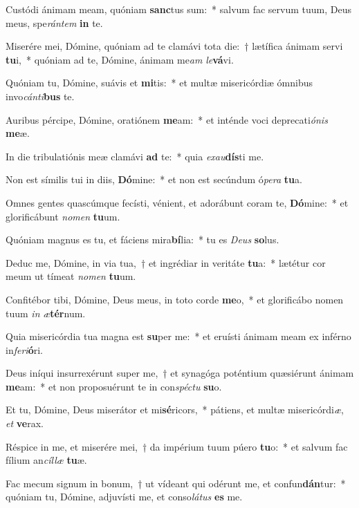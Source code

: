 \item Custódi ánimam meam, quóniam \textbf{sanc}tus sum:~* salvum fac servum tuum, Deus meus, spe\textit{rán}\textit{tem} \textbf{in} te.
\item Miserére mei, Dómine, quóniam ad te clamávi tota die:~† lætífica ánimam servi \textbf{tu}i,~* quóniam ad te, Dómine, ánimam me\textit{am} \textit{le}\textbf{vá}vi.
\item Quóniam tu, Dómine, suávis et \textbf{mi}tis:~* et multæ misericórdiæ ómnibus invo\textit{cán}\textit{ti}\textbf{bus} te.
\item Auribus pércipe, Dómine, oratiónem \textbf{me}am:~* et inténde voci deprecati\textit{ó}\textit{nis} \textbf{me}æ.
\item In die tribulatiónis meæ clamávi \textbf{ad} te:~* quia \textit{ex}\textit{au}\textbf{dís}ti me.
\item Non est símilis tui in diis, \textbf{Dó}mine:~* et non est secúndum ó\textit{pe}\textit{ra} \textbf{tu}a.
\item Omnes gentes quascúmque fecísti, vénient, et adorábunt coram te, \textbf{Dó}mine:~* et glorificábunt \textit{no}\textit{men} \textbf{tu}um.
\item Quóniam magnus es tu, et fáciens mira\textbf{bí}lia:~* tu es \textit{De}\textit{us} \textbf{so}lus.
\item Deduc me, Dómine, in via tua,~† et ingrédiar in veritáte \textbf{tu}a:~* lætétur cor meum ut tímeat \textit{no}\textit{men} \textbf{tu}um.
\item Confitébor tibi, Dómine, Deus meus, in toto corde \textbf{me}o,~* et glorificábo nomen tuum \textit{in} \textit{æ}\textbf{tér}num.
\item Quia misericórdia tua magna est \textbf{su}per me:~* et eruísti ánimam meam ex inférno in\textit{fe}\textit{ri}\textbf{ó}ri.
\item Deus iníqui insurrexérunt super me,~† et synagóga poténtium quæsiérunt ánimam \textbf{me}am:~* et non proposuérunt te in con\textit{spéc}\textit{tu} \textbf{su}o.
\item Et tu, Dómine, Deus miserátor et mi\textbf{sé}ricors,~* pátiens, et multæ misericórdi\textit{æ}, \textit{et} \textbf{ve}rax.
\item Réspice in me, et miserére mei,~† da impérium tuum púero \textbf{tu}o:~* et salvum fac fílium an\textit{cíl}\textit{læ} \textbf{tu}æ.
\item Fac mecum signum in bonum,~† ut vídeant qui odérunt me, et confun\textbf{dán}tur:~* quóniam tu, Dómine, adjuvísti me, et conso\textit{lá}\textit{tus} \textbf{es} me.
